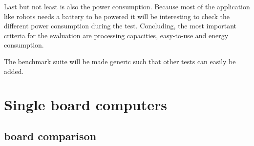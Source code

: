 \documentclass[english]{book_template} %
\begin{document}
Last but not least is also the power consumption. Because most of the application like robots needs a battery to be powered it will be interesting to check the different power consumption during the test. Concluding, the most important criteria for the evaluation are processing capacities, easy-to-use and energy consumption.

The benchmark suite will be made generic such that other tests can easily be added.

\chapter{Single board computers}
\section{board comparison}
\end{document}
